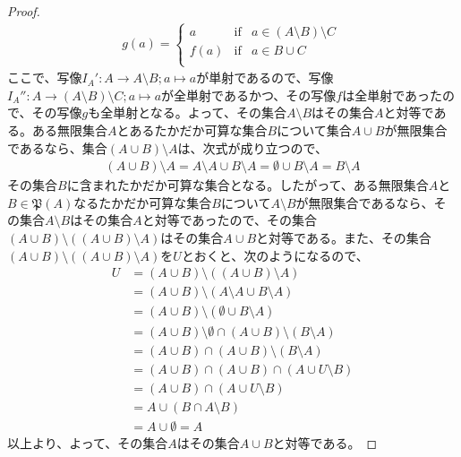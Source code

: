\documentclass[dvipdfmx]{jsarticle}
\begin{document}
\begin{proof}
\begin{align*}
g(a) = \left\{ \begin{matrix}
a & {\mathrm {if}} & a \in (A \setminus B) \setminus C \\
f(a) & {\mathrm {if}} & a \in B \cup C \\
\end{matrix} \right.\ 
\end{align*}
ここで、写像$I_{A}':A \rightarrow A \setminus B;a \mapsto a$が単射であるので、写像$I_{A}'':A \rightarrow (A \setminus B) \setminus C;a \mapsto a$が全単射であるかつ、その写像$f$は全単射であったので、その写像$g$も全単射となる。よって、その集合$A \setminus B$はその集合$A$と対等である。ある無限集合$A$とあるたかだか可算な集合$B$について集合$A \cup B$が無限集合であるなら、集合$(A \cup B) \setminus A$は、次式が成り立つので、
\begin{align*}
(A \cup B) \setminus A = A \setminus A \cup B \setminus A = \emptyset \cup B \setminus A = B \setminus A
\end{align*}
その集合$B$に含まれたかだか可算な集合となる。したがって、ある無限集合$A$と$B \in \mathfrak{P}(A)$なるたかだか可算な集合$B$について$A \setminus B$が無限集合であるなら、その集合$A \setminus B$はその集合$A$と対等であったので、その集合$(A \cup B) \setminus \left( (A \cup B) \setminus A \right)$はその集合$A \cup B$と対等である。また、その集合$(A \cup B) \setminus \left( (A \cup B) \setminus A \right)$を$U$とおくと、次のようになるので、
\begin{align*}
U &= (A \cup B) \setminus \left( (A \cup B) \setminus A \right)\\
&= (A \cup B) \setminus (A \setminus A \cup B \setminus A)\\
&= (A \cup B) \setminus (\emptyset \cup B \setminus A)\\
&= (A \cup B) \setminus \emptyset \cap (A \cup B) \setminus (B \setminus A)\\
&= (A \cup B) \cap (A \cup B) \setminus (B \setminus A)\\
&= (A \cup B) \cap (A \cup B) \cap (A \cup U \setminus B)\\
&= (A \cup B) \cap (A \cup U \setminus B)\\
&= A \cup (B \cap A \setminus B) \\
&= A \cup \emptyset = A
\end{align*}
以上より、よって、その集合$A$はその集合$A \cup B$と対等である。
\end{proof}
\end{document}
